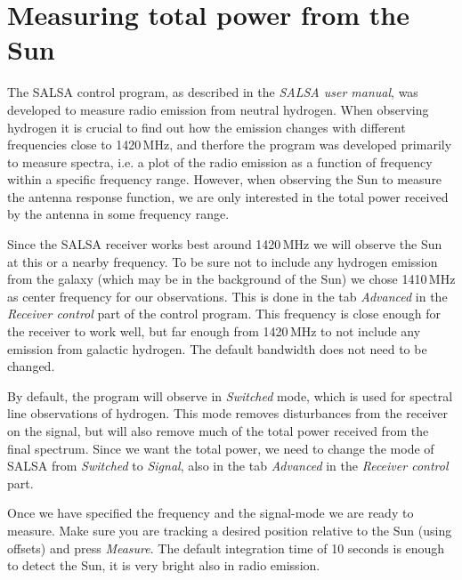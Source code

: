 \section{Measuring total power from the Sun}
The SALSA control program, as described in the \emph{SALSA user manual}, was
developed to measure radio emission from neutral hydrogen. When observing
hydrogen it is crucial to find out how the emission changes with different
frequencies close to 1420\,MHz, and therfore the program was developed
primarily to measure {spectra}, i.e. a plot of the radio emission as a function
of frequency within a specific frequency range. However, when observing the Sun
to measure the antenna response function, we are only interested in the total
power received by the antenna in some frequency range.


Since the SALSA receiver works best around 1420\,MHz we will observe the Sun at
this or a nearby frequency. To be sure not to include any hydrogen emission
from the galaxy (which may be in the background of the Sun) we chose 1410\,MHz
as center frequency for our observations. This is done in the tab
\emph{Advanced} in the \emph{Receiver control} part of the control program.
This frequency is close enough for the receiver to work well, but far enough
from 1420\,MHz to not include any emission from galactic hydrogen.  The default
bandwidth does not need to be changed.

By default, the program will observe in \emph{Switched} mode, which is used for
spectral line observations of hydrogen. This mode removes disturbances from
the receiver on the signal, but will also remove much of the total power 
received from the final spectrum. Since we want the total
power, we need to change the mode of SALSA from \emph{Switched} to
\emph{Signal}, also in the tab \emph{Advanced} in the \emph{Receiver control}
part.

Once we have specified the frequency and the signal-mode we are ready to
measure.  Make sure you are tracking a desired position relative to the Sun
(using offsets) and press \emph{Measure}. The default integration time of 10
seconds is enough to detect the Sun, it is very bright also in radio emission.


